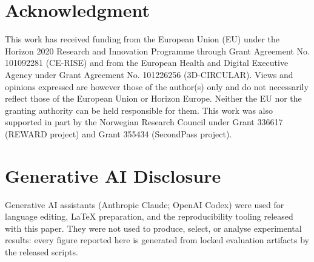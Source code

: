 \documentclass[conference]{IEEEtran}
\begin{document}
\section*{Acknowledgment}
This work has received funding from the European Union (EU) under the Horizon 2020 Research and Innovation Programme through Grant Agreement No. 101092281 (CE-RISE) and from the European Health and Digital Executive Agency under Grant Agreement No. 101226256 (3D-CIRCULAR).
Views and opinions expressed are however those of the
author(s) only and do not necessarily reflect those of the
European Union or Horizon Europe. Neither the EU nor the granting authority can be held responsible for
them.
This work was also supported in part by the Norwegian Research
Council under Grant 336617 (REWARD project) and Grant 355434 (SecondPass project).


\section*{Generative AI Disclosure}
Generative AI assistants (Anthropic Claude; OpenAI Codex) were used for language
editing, \LaTeX{} preparation, and the reproducibility tooling released with this
paper. They were not used to produce, select, or analyse experimental results:
every figure reported here is generated from locked evaluation artifacts by the
released scripts. 



\end{document}
